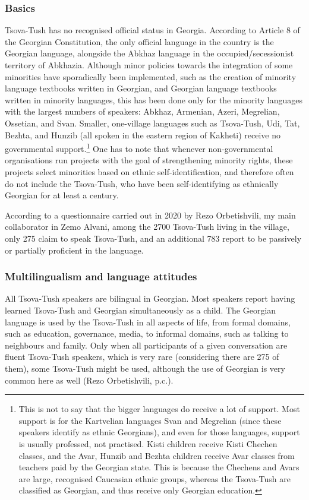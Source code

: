 \subsubsection{Basics}


Tsova-Tush has no recognised official status in Georgia. According to Article 8 of the Georgian Constitution, the only official language in the country is the Georgian language, alongside the Abkhaz language in the occupied/secessionist territory of Abkhazia. Although minor policies towards the integration of some minorities have sporadically been implemented, such as the creation of minority language textbooks written in Georgian, and Georgian language textbooks written in minority languages, this has been done only for the minority languages with the largest numbers of speakers: Abkhaz, Armenian, Azeri, Megrelian, Ossetian, and Svan. Smaller, one-village languages such as Tsova-Tush, Udi, Tat, Bezhta, and Hunzib (all spoken in the eastern region of Kakheti) receive no governmental support.\footnote{This is not to say that the bigger languages do receive a lot of support. Most support is for the Kartvelian languages Svan and Megrelian (since these speakers identify as ethnic Georgians), and even for those languages, support is usually professed, not practised. Kisti children receive Kisti Chechen classes, and the Avar, Hunzib and Bezhta children receive Avar classes from teachers paid by the Georgian state. This is because the Chechens and Avars are large, recognised Caucasian ethnic groups, whereas the Tsova-Tush are classified as Georgian, and thus receive only Georgian education.} One has to note that whenever non-governmental organisations run projects with the goal of strengthening minority rights, these projects select minorities based on ethnic self-identification, and therefore often do not include the Tsova-Tush, who have been self-identifying as ethnically Georgian for at least a century.

According to a questionnaire carried out in 2020 by Rezo Orbetishvili, my main collaborator in Zemo Alvani, among the 2700 Tsova-Tush living in the village, only 275 claim to speak Tsova-Tush, and an additional 783 report to be passively or partially proficient in the language.

\subsubsection{Multilingualism and language attitudes} \label{attitude}

All Tsova-Tush speakers are bilingual in Georgian. Most speakers report having learned Tsova-Tush and Georgian simultaneously as a child. The Georgian language is used by the Tsova-Tush in all aspects of life, from formal domains, such as education, governance, media, to informal domains, such as talking to neighbours and family. Only when all participants of a given conversation are fluent Tsova-Tush speakers, which is very rare (considering there are 275 of them), some Tsova-Tush might be used, although the use of Georgian is very common here as well (Rezo Orbetishvili, p.c.). 

